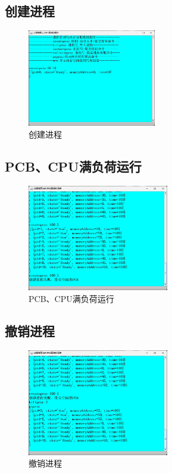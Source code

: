 \documentclass[UTF8,12pt]{article}
\begin{document}
\subsection{创建进程}
\begin{figure}[htbp]
    \centering
    \includegraphics[width=0.5\textwidth]{img/2.png}
    \caption{创建进程}
\end{figure}

\newpage

\subsection{PCB、CPU满负荷运行}
\begin{figure}[htbp]
    \centering
    \includegraphics[width=0.55\textwidth]{img/3.png}
    \caption{PCB、CPU满负荷运行}
\end{figure}

\subsection{撤销进程}
\begin{figure}[htbp]
    \centering
    \includegraphics[width=0.55\textwidth]{img/4.png}
    \caption{撤销进程}
\end{figure}
\end{document}
